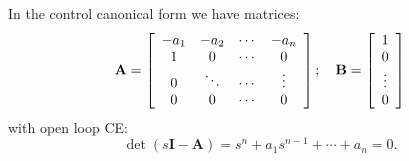 In the control canonical form we have matrices:
\[
{\bf{A}} = \left[ {\begin{array}{*{20}c}
   { - a_1 } & { - a_2 } &  \cdots  & { - a_n }  \\
   1 & 0 &  \cdots  & 0  \\
   0 &  \ddots  &  \cdots  &  \vdots   \\
   0 & 0 &  \cdots  & 0  \\
\end{array}} \right];\quad {\bf{B}} = \left[ {\begin{array}{*{20}c}
   1  \\
   0  \\
    \vdots   \\
   0  \\
\end{array}} \right]
\]
with open loop CE:
\[
\det(s\mathbf{I}-\mathbf{A})=s^n+a_1s^{n-1}+\cdots+a_n=0.
\]

\endinput

